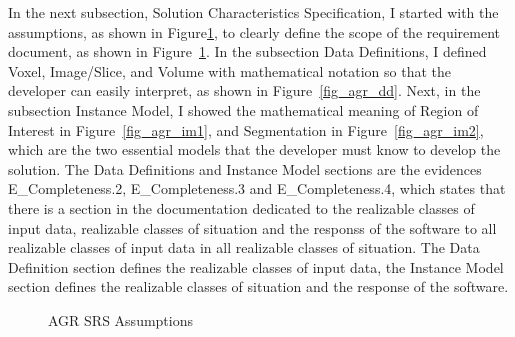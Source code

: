 \begin{itemize}
In the next subsection, Solution Characteristics Specification, I started with the assumptions, as shown in Figure\ref{fig_agr_srs_a},  to clearly define the scope of the requirement document, as shown in Figure~\ref{fig_agr_srs_a}. In the subsection Data Definitions, I defined Voxel, Image/Slice, and Volume with mathematical notation so that the developer can easily interpret,  as shown in Figure~\ref{fig_agr_dd}. Next, in the subsection Instance Model, I showed the mathematical meaning of Region of Interest in Figure~\ref{fig_agr_im1}, and Segmentation in Figure~\ref{fig_agr_im2}, which are the two essential models that the developer must know to develop the solution. The Data Definitions and Instance Model sections are the evidences E\_Completeness.2, E\_Completeness.3 and E\_Completeness.4, which states that there is a section in the documentation dedicated to the realizable classes of input data, realizable classes of situation and the responss of the software to all realizable classes of input data in all realizable classes of situation. The Data Definition section defines the realizable classes of input data, the Instance Model section defines the realizable classes of situation and the response of the software.

\begin{figure}[H]
    \centering
    \caption[AGR SRS Assumptions]{AGR SRS Assumptions}
    \label{fig_agr_srs_a}
\end{figure}


\end{itemize}
